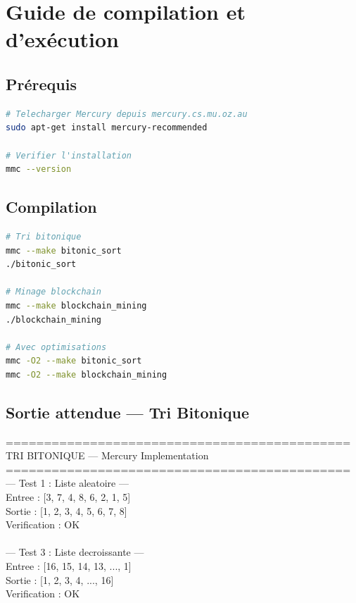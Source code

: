 \documentclass[12pt,a4paper]{article}
\begin{document}
\section{Guide de compilation et d'exécution}

\subsection{Prérequis}

\begin{lstlisting}[language=bash, caption={Installation de Mercury (Ubuntu/Debian)}]
# Telecharger Mercury depuis mercury.cs.mu.oz.au
sudo apt-get install mercury-recommended

# Verifier l'installation
mmc --version
\end{lstlisting}

\subsection{Compilation}

\begin{lstlisting}[language=bash, caption={Compiler les deux programmes}]
# Tri bitonique
mmc --make bitonic_sort
./bitonic_sort

# Minage blockchain
mmc --make blockchain_mining
./blockchain_mining

# Avec optimisations
mmc -O2 --make bitonic_sort
mmc -O2 --make blockchain_mining
\end{lstlisting}

\subsection{Sortie attendue — Tri Bitonique}

\begin{tcolorbox}[colback=black!90,coltext=green!80,fontupper=\ttfamily\small]
=============================================\\
   TRI BITONIQUE --- Mercury Implementation\\
=============================================\\
--- Test 1 : Liste aleatoire ---\\
Entree  : [3, 7, 4, 8, 6, 2, 1, 5]\\
Sortie  : [1, 2, 3, 4, 5, 6, 7, 8]\\
Verification : OK\\
\\
--- Test 3 : Liste decroissante ---\\
Entree  : [16, 15, 14, 13, ..., 1]\\
Sortie  : [1, 2, 3, 4, ..., 16]\\
Verification : OK
\end{tcolorbox}
\end{document}
